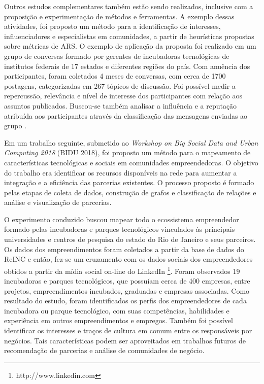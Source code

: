 Outros estudos complementares também estão sendo realizados, inclusive com a proposição e experimentação de métodos e ferramentas. A exemplo dessas atividades, foi proposto um método para a identificação de interesses, influenciadores e especialistas em comunidades, a partir de heurísticas propostas sobre métricas de ARS. O exemplo de aplicação da proposta foi realizado em um grupo de conversas formado por gerentes de incubadoras tecnológicas de institutos federais de 17 estados e diferentes regiões do país. Com anuência dos  participantes, foram coletados 4 meses de conversas, com cerca de 1700 postagens, categorizadas em 267 tópicos de discussão. Foi possível medir a repercussão, relevância e nível de interesse dos participantes com relação aos assuntos publicados. Buscou-se também analisar a influência e a reputação atribuída aos participantes através da classificação das mensagens enviadas ao grupo \cite{escalfoni-et-al:2018}.

Em um trabalho seguinte, submetido ao \textit{Workshop on Big Social Data and Urban Computing 2018} (BIDU 2018), foi proposto um método para o mapeamento de características tecnológicas e sociais em comunidades empreendedoras. O objetivo do trabalho era identificar os recursos disponíveis na rede para aumentar a integração e a eficiência das parcerias existentes. O processo proposto é formado pelas etapas de coleta de dados, construção de grafos e classificação de relações e análise e visualização de parcerias. %

O experimento conduzido buscou mapear todo o ecossistema empreendedor formado pelas incubadoras e parques tecnológicos vinculados às principais universidades e centros de pesquisa do estado do Rio de Janeiro e seus parceiros. Os dados dos empreendimentos foram coletados a partir da base de dados do ReINC e então, fez-se um cruzamento com os dados sociais dos empreendedores obtidos a partir da mídia social on-line do LinkedIn \footnote{http://www.linkedin.com}. Foram observados 19 incubadoras e parques tecnológicos, que possuíam cerca de 400 empresas, entre projetos,  empreendimentos incubados, graduadas e empresas associadas. Como resultado do estudo, foram identificados os perfis dos empreendedores de cada incubadora ou parque tecnológico, com suas competências, habilidades e experiência em outros empreendimentos e empregos. Também foi possível identificar os interesses e traços de cultura em comum entre os responsáveis por negócios. Tais características podem ser aproveitados em trabalhos futuros de recomendação de parcerias e análise de comunidades de negócio.


